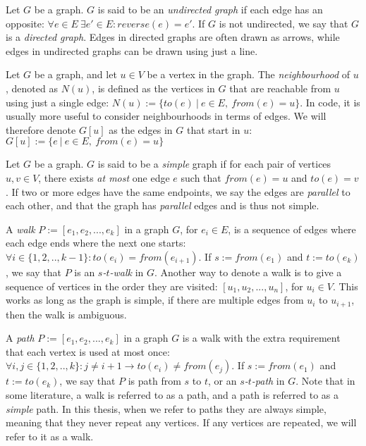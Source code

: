 \begin{definition}
    Let $G$ be a graph. $G$ is said to be an \emph{undirected graph} if each edge has an opposite: $\forall e \in E ~ \exists e' \in E : reverse(e) = e'$.
    If $G$ is not undirected, we say that $G$ is a \emph{directed graph}.
    Edges in directed graphs are often drawn as arrows, while edges in undirected graphs can be drawn using just a line.
\end{definition}

\begin{definition}[Neighbourhood]
    Let $G$ be a graph, and let $u \in V$ be a vertex in the graph. The \emph{neighbourhood} of $u$, denoted as $N(u)$, is defined as the vertices in $G$ that are reachable from $u$ using just a single edge: $N(u) := \{ to(e)  ~|~  e \in E, ~ from(e) = u\}$. 
    In code, it is usually more useful to consider neighbourhoods in terms of edges. We will therefore denote $G[u]$ as the edges in $G$ that start in $u$: $G[u] := \{e ~ | ~ e \in E, ~ from(e) = u\}$
\end{definition}

\begin{definition}
    Let $G$ be a graph. $G$ is said to be a \emph{simple} graph if for each pair of vertices $u,v \in V$, there exists \emph{at most} one edge $e$ such that $from(e) = u$ and $to(e) = v$. If two or more edges have the same endpoints, we say the edges are \emph{parallel} to each other, and that the graph has \emph{parallel} edges and is thus not simple.
\end{definition}

\begin{definition}[Walk]
    A \emph{walk} $P := [e_1, e_2, ..., e_k]$ in a graph $G$, for $e_i \in E$, is a sequence of edges where each edge ends where the next one starts: $\forall i \in \{1,2,..,k-1\} : to(e_i) = from(e_{i+1})$.
    If $s := from(e_1)$ and $t := to(e_k)$, we say that $P$ is an \emph{$s$-$t$-walk} in $G$.
    Another way to denote a walk is to give a sequence of vertices in the order they are visited: $[u_1, u_2, ..., u_n]$, for $u_i \in V$. This works as long as the graph is simple, if there are multiple edges from $u_i$ to $u_{i+1}$, then the walk is ambiguous.
\end{definition}

\begin{definition}[Path]
    A \emph{path} $P := [e_1, e_2, ..., e_k]$ in a graph $G$ is a walk with the extra requirement that each vertex is used at most once: $\forall i, j \in \{1,2,..,k\} : j \neq {i+1} \rightarrow to(e_i) \neq from(e_j)$.
    If $s := from(e_1)$ and $t := to(e_k)$, we say that $P$ is path from $s$ to $t$, or an \emph{$s$-$t$-path} in $G$.
    Note that in some literature, a walk is referred to as a path, and a path is referred to as a \emph{simple} path. In this thesis, when we refer to paths they are always simple, meaning that they never repeat any vertices. If any vertices are repeated, we will refer to it as a walk.    
\end{definition}

